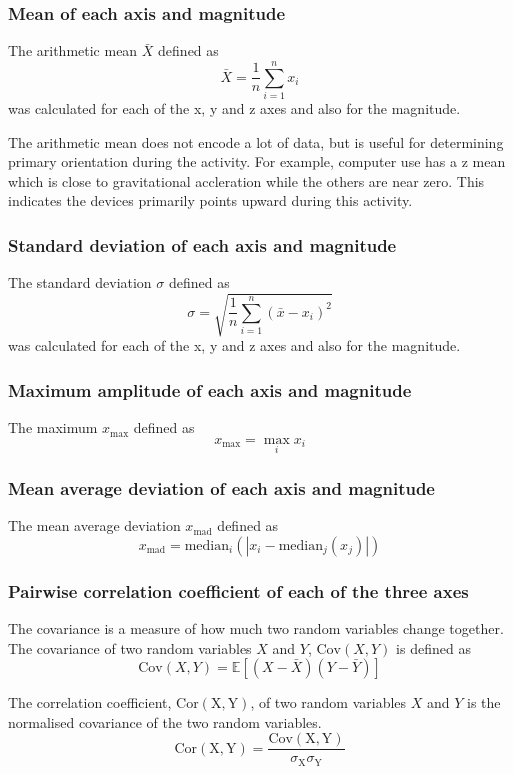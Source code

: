       \subsubsection{Mean of each axis and magnitude}
        The arithmetic mean $\bar{X}$ defined as $$\bar{X} = \frac{1}{n}\sum\limits_{i = 1}^{n}x_i$$ was calculated for each of the x, y and z axes and also for the magnitude.
        
        The arithmetic mean does not encode a lot of data, but is useful for determining primary orientation during the activity. For example, computer use has a z mean which is close to gravitational accleration while the others are near zero. This indicates the devices primarily points upward during this activity.
      
      \subsubsection{Standard deviation of each axis and magnitude}
        The standard deviation $\sigma$ defined as $$\sigma = \sqrt{\frac{1}{n}\sum\limits_{i = 1}^{n}(\bar{x}-x_i)^2}$$ was calculated for each of the x, y and z axes and also for the magnitude.
        
      \subsubsection{Maximum amplitude of each axis and magnitude}
        The maximum $x_{\max}$ defined as $$x_{\max} = \max_i x_i $$
      \subsubsection{Mean average deviation of each axis and magnitude}
        The mean average deviation $x_\mathrm{mad}$ defined as $$x_\mathrm{mad} = \mathrm{median}_i (|x_i - \mathrm{median}_j(x_j)|)$$
      \subsubsection{Pairwise correlation coefficient of each of the three axes}
        The covariance is a measure of how much two random variables change together. The covariance of two random variables $X$ and $Y$, $\mathrm{Cov}(X, Y)$ is defined as $$\mathrm{Cov}(X, Y) = \mathbb{E}[(X - \bar{X})(Y - \bar{Y})]$$
        
        The correlation coefficient, $\mathrm{Cor(X,Y)}$, of two random variables $X$ and $Y$ is the normalised covariance of the two random variables. $$\mathrm{Cor(X,Y)} = \frac{\mathrm{Cov(X,Y)}}{\sigma_{\mathrm{X}}\sigma_{\mathrm{Y}}}$$
        

